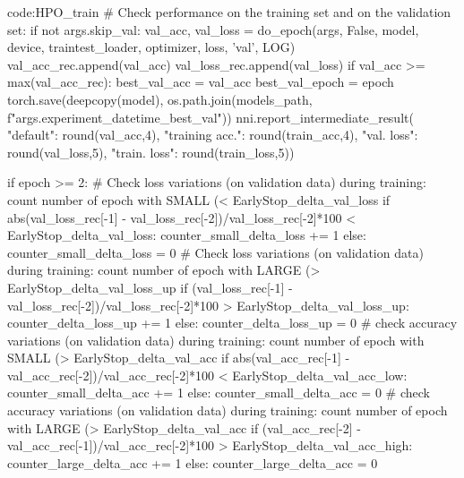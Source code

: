\begin{mycodebox}{code:HPO_train}
                # Check performance on the training set and on the validation set:
                if not args.skip_val:
                    val_acc, val_loss = do_epoch(args, False, model, device, traintest_loader, optimizer, loss, 'val', LOG)
                    val_acc_rec.append(val_acc)
                    val_loss_rec.append(val_loss)
                    if val_acc >= max(val_acc_rec):
                        best_val_acc = val_acc
                        best_val_epoch = epoch
                        torch.save(deepcopy(model), 
                            os.path.join(models_path,
                                f"{args.experiment_datetime}_best_val"))
                    nni.report_intermediate_result({
                        "default": round(val_acc,4),
                        "training acc.": round(train_acc,4),
                        "val. loss": round(val_loss,5),
                        "train. loss": round(train_loss,5)})
                
                if epoch >= 2:
                    # Check loss variations (on validation data) during training: count number of epoch with SMALL (< EarlyStop_delta_val_loss %
                    if abs(val_loss_rec[-1] - val_loss_rec[-2])/val_loss_rec[-2]*100 < EarlyStop_delta_val_loss:
                        counter_small_delta_loss += 1
                    else:
                        counter_small_delta_loss = 0
                    # Check loss variations (on validation data) during training: count number of epoch with LARGE (> EarlyStop_delta_val_loss_up %
                    if (val_loss_rec[-1] - val_loss_rec[-2])/val_loss_rec[-2]*100 > EarlyStop_delta_val_loss_up:
                        counter_delta_loss_up += 1
                    else:
                        counter_delta_loss_up = 0
                    # check accuracy variations (on validation data) during training: count number of epoch with SMALL (> EarlyStop_delta_val_acc %
                    if abs(val_acc_rec[-1] - val_acc_rec[-2])/val_acc_rec[-2]*100 < EarlyStop_delta_val_acc_low:
                        counter_small_delta_acc += 1
                    else:
                        counter_small_delta_acc = 0
                    # check accuracy variations (on validation data) during training: count number of epoch with LARGE (> EarlyStop_delta_val_acc %
                    if (val_acc_rec[-2] - val_acc_rec[-1])/val_acc_rec[-2]*100 > EarlyStop_delta_val_acc_high:
                        counter_large_delta_acc += 1
                    else:
                        counter_large_delta_acc = 0
        

\end{mycodebox}
